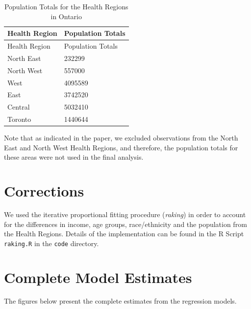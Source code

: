 \documentclass[
  letterpaper,
  DIV=11,
  numbers=noendperiod]{scrartcl}
\begin{document}
\hypertarget{tbl-health-regions}{}
\begin{longtable}[]{@{}ll@{}}
\caption{\label{tbl-health-regions}Population Totals for the Health
Regions in Ontario}\tabularnewline
\toprule\noalign{}
Health Region & Population Totals \\
\midrule\noalign{}
\endfirsthead
\toprule\noalign{}
Health Region & Population Totals \\
\midrule\noalign{}
\endhead
\bottomrule\noalign{}
\endlastfoot
North East & 232299 \\
North West & 557000 \\
West & 4095589 \\
East & 3742520 \\
Central & 5032410 \\
Toronto & 1440644 \\
\end{longtable}

Note that as indicated in the paper, we excluded observations from the
North East and North West Health Regions, and therefore, the population
totals for these areas were not used in the final analysis.

\hypertarget{corrections}{%
\section{Corrections}\label{corrections}}

We used the iterative proportional fitting procedure (\emph{raking}) in
order to account for the differences in income, age groups,
race/ethnicity and the population from the Health Regions. Details of
the implementation can be found in the R Script \texttt{raking.R} in the
\texttt{code} directory.

\hypertarget{complete-model-estimates}{%
\section{Complete Model Estimates}\label{complete-model-estimates}}

The figures below present the complete estimates from the regression
models.
\end{document}
